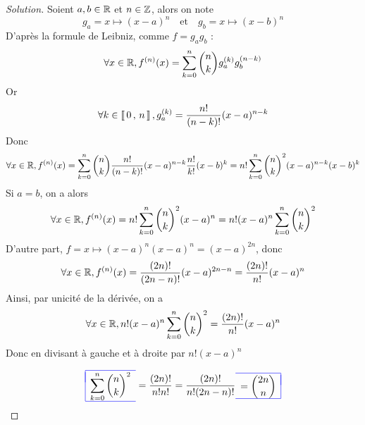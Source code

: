 \documentclass{classe}
\newcommand{\lboxed}[1]{{\color{blue}\begin{array}{|l}\hline\\[-2.4ex]{\color{black}#1}\\[1.2ex]\hline\end{array}}}
\newcommand{\rboxed}[1]{{\color{blue}\begin{array}{r|}\hline\\[-2.4ex]{\color{black}#1}\\[1.2ex]\hline\end{array}}}
\newenvironment{solution}
  {\renewcommand\qedsymbol{$\blacksquare$}\begin{proof}[Solution]}
  {\end{proof}}
\begin{document}
\begin{solution}
Soient $a,b\in\mathbb{R}$ et $n \in \mathbb{Z}$, alors on note 
\[
g_a = x\longmapsto (x-a)^n \quad\text{et}\quad g_b = x \longmapsto (x-b)^n
\]
D'après la formule de Leibniz, comme $f = g_a g_b$ :
\[
\forall x \in \mathbb{R},f^{(n)}(x) = \sum\limits_{k=0}^{n} \binom{n}{k} g_a^{(k)} g_b^{(n-k)}
\]
Or 
\[
\forall k \in \left\llbracket \, 0 \, , \, n \, \right\rrbracket, g_a^{(k)} = \dfrac{n!}{(n-k)!} (x-a)^{n-k}
\]
Donc 
\[
\forall x \in \mathbb{R},f^{(n)}(x) 
= \sum\limits_{k=0}^{n} \binom{n}{k}  \dfrac{n!}{(n-k)!} (x-a)^{n-k}  \dfrac{n!}{k!} (x-b)^{k}
= n! \sum\limits_{k=0}^{n} \binom{n}{k}^2  (x-a)^{n-k} (x-b)^{k}
\]
Si $a = b$, on a alors
\[
\forall x \in \mathbb{R},f^{(n)}(x) 
= n! \sum\limits_{k=0}^{n} \binom{n}{k}^2 (x-a)^{n}
=n!(x-a)^{n}\sum\limits_{k=0}^{n} \binom{n}{k}^2
\]
D'autre part, $f = x \longmapsto (x-a)^n (x-a)^n = (x-a)^{2n}$, donc 
\[
\forall x \in \mathbb{R},f^{(n)}(x) 
=  \dfrac{(2n)!}{(2n-n)!} (x-a)^{2n-n} =   \dfrac{(2n)!}{n!} (x-a)^{n}
\]
Ainsi, par unicité de la dérivée, on a 
\[
\forall x \in \mathbb{R},
n!(x-a)^{n}\sum\limits_{k=0}^{n} \binom{n}{k}^2 = \dfrac{(2n)!}{n!} (x-a)^{n}
\]
Donc en divisant à gauche et à droite par $n!(x-a)^{n}$

\[
\lboxed{\displaystyle\sum\limits_{k=0}^{n} \binom{n}{k}^2}
= \dfrac{(2n)!}{n!n!}
= \dfrac{(2n)!}{n!(2n-n)!} 
\rboxed{= \displaystyle\binom{2n}{n}}
\]
\end{solution}

\newpage
\pagestyle{PageNormale}
\end{document}
